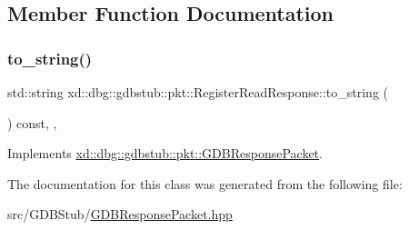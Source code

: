 \subsection{Member Function Documentation}
\mbox{\label{classxd_1_1dbg_1_1gdbstub_1_1pkt_1_1_register_read_response_a3eeffab928cc7e45c86656ffe8c53608}} 
\subsubsection{\texorpdfstring{to\+\_\+string()}{to\_string()}}
{\footnotesize\ttfamily std\+::string xd\+::dbg\+::gdbstub\+::pkt\+::\+Register\+Read\+Response\+::to\+\_\+string (\begin{DoxyParamCaption}{ }\end{DoxyParamCaption}) const\hspace{0.3cm}{\ttfamily [inline]}, {\ttfamily [override]}, {\ttfamily [virtual]}}



Implements \mbox{\hyperlink{classxd_1_1dbg_1_1gdbstub_1_1pkt_1_1_g_d_b_response_packet_a2a15795536cd5ff94f0533c406233874}{xd\+::dbg\+::gdbstub\+::pkt\+::\+G\+D\+B\+Response\+Packet}}.



The documentation for this class was generated from the following file\+:\begin{DoxyCompactItemize}
\item 
src/\+G\+D\+B\+Stub/\mbox{\hyperlink{_g_d_b_response_packet_8hpp}{G\+D\+B\+Response\+Packet.\+hpp}}\end{DoxyCompactItemize}
